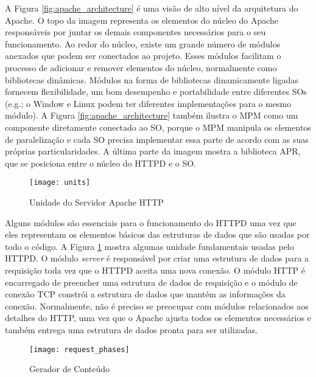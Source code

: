 A Figura \ref{fig:apache_architecture} é uma visão de alto nível da arquitetura
do Apache. O topo da imagem representa os elementos do núcleo do Apache
responsáveis por juntar os demais componentes necessários para o seu
funcionamento. Ao redor do núcleo, existe um grande número de módulos anexados
que podem ser conectados ao projeto. Esses módulos facilitam o processo de
adicionar e remover elementos do núcleo, normalmente como bibliotecas
dinâmicas. Módulos na forma de bibliotecas dinamicamente ligadas fornecem
flexibilidade, um bom desempenho e portabilidade entre diferentes SOs (e.g.; o
Window e Linux podem ter diferentes implementações para o mesmo módulo). A
Figura \ref{fig:apache_architecture} também ilustra o MPM como um componente
diretamente conectado ao SO, porque o MPM manipula os elementos de
paralelização e cada SO precisa implementar essa parte de acordo com as suas
próprias particularidades. A última parte da imagem mostra a biblioteca APR,
que se posiciona entre o núcleo do HTTPD e o SO.

\begin{figure}[!h]
  \centering
  \texttt{[image: units]} 
  \caption{Unidade do Servidor Apache HTTP}
  \label{fig:units} 
\end{figure}

Alguns módulos são essenciais para o funcionamento do HTTPD uma vez que eles
representam os elementos básicos das estruturas de dados que são usadas por
todo o código. A Figura \ref{fig:units} mostra algumas unidade fundamentais
usadas pelo HTTPD. O módulo \textit{server} é responsável por criar uma estrutura de
dados para a requisição toda vez que o HTTPD aceita uma nova conexão. O módulo
HTTP é encarregado de preencher uma estrutura de dados de requisição e o
módulo de conexão TCP constrói a estrutura de dados que mantém as informações
da conexão. Normalmente, não é preciso se preocupar com módulos relacionados
aos detalhes do HTTP, uma vez que o Apache ajusta todos os elementos necessários
e também entrega uma estrutura de dados pronta para ser utilizadas.

\begin{figure}[!h]
  \centering
  \texttt{[image: request\_phases]} 
	\caption[Gerador de Conteúdo]{Gerador de Conteúdo \citep{apache_module_book}}
  \label{fig:content_generator} 
\end{figure}

